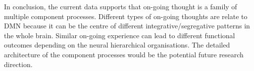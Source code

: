 In conclusion, the current data supports that on-going thought is a family of multiple component processes. Different types of on-going thoughts are relate to DMN because it can be the centre of different integrative/segregative patterns in the whole brain. Similar on-going experience can lead to different functional outcomes depending on the neural hierarchical organisations. The detailed architecture of the component processes would be the potential future research direction. 
 


